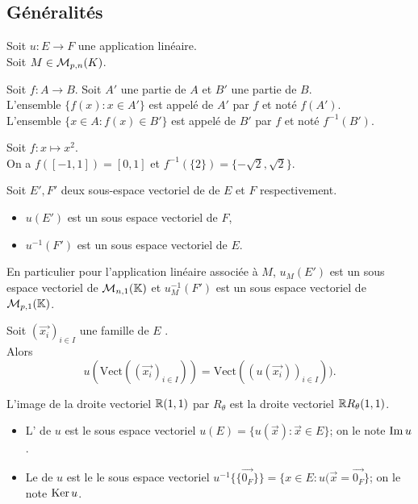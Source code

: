 \documentclass{book}
\begin{document}
\subsection{Généralités}
Soit $u:E\to F$ une application linéaire.\\
Soit $M\in\mathcal{M}_{p,n}(K)$.
\begin{Definition}
Soit $f:A\to B$. Soit $A'$ une partie de $A$ et $B'$ une partie de $B$.\\
L'ensemble $\{f(x): x  \in  A'\}$ est appelé  de $A'$ par $f$ et noté $f(A')$.\\
L'ensemble $\{x\in A : f(x)  \in  B'\}$ est appelé  de $B'$ par $f$ et noté $f^{-1}(B')$.\\
\end{Definition}
\begin{Exemple}[Carré]
Soit $f:x\mapsto x^2$.\\
On a $f([-1,1])=[0,1]$ et $f^{-1}(\{2\})=\{-\sqrt{2},\sqrt{2}\}$.
\end{Exemple}
\begin{Proposition}
Soit $E',F'$ deux sous-espace vectoriel de de $E$ et $F$ respectivement.\\
\begin{itemize}
\item $u(E')$ est un sous espace vectoriel de $F$,
\item $u^{-1}(F')$ est un sous espace vectoriel de $E$.
\end{itemize}
\end{Proposition}
\begin{Remarque}
En particulier pour l'application linéaire associée à $M$,  $u_M(E')$ est un sous espace vectoriel de $\mathcal{M}_{n,1}(\mathbb{K})$ et $u_M^{-1}(F')$ est un sous espace vectoriel de $\mathcal{M}_{p,1}(\mathbb{K})$.
\end{Remarque}
\begin{Proposition}
Soit $(\vec{x_i})_{i\in I}$ une famille de $E$ .\\
Alors $$ u(\text{Vect}((\vec{x_i})_{i\in I}))=\text{Vect}( \left(u(\vec{x_i})\right)_{i\in I})).$$
\end{Proposition}
\begin{Exemple}
L'image de la droite vectoriel $\mathbb{R} (1,1)$ par $R_\theta$ est la droite vectoriel $\mathbb{R} R_\theta(1,1)$.
\end{Exemple}
\begin{Definition}
\begin{itemize}
\item
  L' de $u$ est le sous espace vectoriel $u(E) = \{u(\vec{x}):\vec{x}\in  E\}$;
  on le note $\operatorname{Im} u$.
\item
  Le  de $u$ est le le sous espace vectoriel $u^{-1}\{ \{\vec{0_F}\}\} = \{x\in  E:u(\vec{x}=\vec{0_F}\}$;
  on le note $\operatorname{Ker} u$.
\end{itemize}
\end{Definition}
\end{document}
